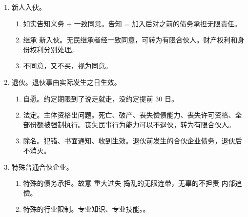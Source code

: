 \begin{enumerate}
\begin{enumerate}
\begin{enumerate}
                  \item 强制执行。法院通知全体 \yjt 没人买又不同意转让份额 \yjt 削减份额/退伙结算。
                \end{enumerate}
        \end{enumerate}
  \item 新人入伙。
        \begin{enumerate}
          \item 如实告知义务 + 一致同意。告知 = 加入后对之前的债务承担无限责任。
          \item 继承 \ydy 新入伙。无民继承者经一致同意，可转为有限合伙人。财产权利和身份权利分别处理。
          \item 不同意，又不买，视为同意。
        \end{enumerate}
  \item 退伙。退伙事由实际发生之日生效。
        \begin{enumerate}
          \item 自愿。约定期限到了说走就走，没约定提前 30 日。
          \item 法定。主体资格出问题。死亡、破产、丧失偿债能力、丧失许可资格、全部份额被强制执行。丧失民事行为能力可以不退伙，转为有限合伙人。
          \item 除名。犯错、书面通知、收到生效。\sjt 退伙前发生的合伙企业债务，退伙后不消灭。
        \end{enumerate}
  \item 特殊普通合伙企业。
        \begin{enumerate}
          \item 特殊的债务承担。故意 \hz 重大过失 \yjt 捣乱的无限连带，无辜的不担责 \yjt 内部追偿。
          \item 特殊的行业限制。专业知识、专业技能。。
        \end{enumerate}
\end{enumerate}